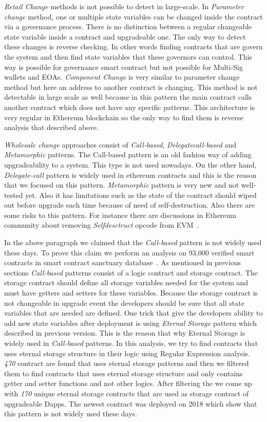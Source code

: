 \textit{Retail Change} methods is not possible to detect in large-scale. In \textit{Parameter change} method, one or multiple state variables can be changed inside the contract via a governance process. There is no distinction between a regular changeable state variable inside a contract and upgradeable one. The only way to detect these changes is reverse checking. In other words finding contracts that are govern the system and then find state variables that these governors can control. This way is possible for governance smart contract but not possible for Multi-Sig wallets and EOAs. 
\textit{Component Change} is very similar to parameter change method but here an address to another contract is changing. This method is not detectable in large scale as well because in this pattern the main contract calls another contract which does not have any specific patterns. This architecture is very regular in Ethereum blockchain so the only way to find them is reverse analysis that described above.

\textit{Wholesale change} approaches consist of \textit{Call-based}, \textit{Delegatecall-based} and \textit{Metamorphic} patterns. The Call-based pattern is an old fashion way of adding upgradeability to a system. This type is not used nowadays. On the other hand, \textit{Delegate-call}  pattern is widely used in ethereum contracts and this is the reason that we focused on this pattern. \textit{Metamorphic} pattern is very new and not well-tested yet. Also it has limitations such as the state of the contract should wiped out before upgrade each time because of need of self-destruction. Also there are some risks to this pattern. For instance there are discussions in Ethereum community about removing \textit{Selfdesctruct} opcode from EVM~\cite{selfDestruct}. 

In the above paragraph we claimed that the \textit{Call-based} pattern is not widely used these days. To prove this claim we perform an analysis on 93,000 verified smart contracts in smart contract sanctuary database~\cite{smart_contract_sanctuary}. As mentioned in previous sections \textit{Call-based} patterns consist of a logic contract and storage contract. The storage contract should define all storage variables needed for the system and must have getters and setters for these variables. Because the storage contract is not changeable in upgrade event the developers should be sure that all state variables that are needed are defined. One trick that give the developers ability to add new state variables after deployment is using \textit{Eternal Storage} pattern which described in previous version. This is the reason that why Eternal Storage is widely used in \textit{Call-based} patterns. In this analysis, we try to find contracts that uses eternal storage structure in their logic using Regular Expression analysis. \emph{470} contract are found that uses eternal storage patterns and then we filtered them to find contracts that uses eternal storage structure and only contains getter and setter functions and not other logics. After filtering the we come up with \emph{170} unique eternal storage contracts that are used as storage contract of upgradeable Dapps. The newest contract was deployed on 2018 which show that this pattern is not widely used these days.


